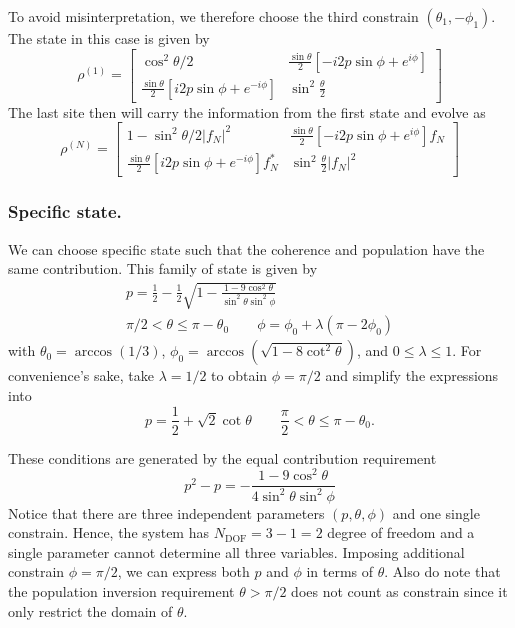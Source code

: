 \documentclass[../../../main.tex]{subfiles}
\begin{document}
To avoid misinterpretation, we therefore choose the third constrain \((\theta_1,-\phi_1)\).
The state in this case is given by
\begin{equation*}
  \rho ^{(1)} =
  \begin{bmatrix}
    \cos ^2 \theta/2                                                 & \frac{\sin \theta}{2} \left[-i2p \sin \phi + e^{i\phi}  \right] \\
    \frac{\sin \theta  }{2} \left[i2p \sin\phi + e^{-i\phi}  \right] & \sin ^2 \frac{\theta  }{2}
  \end{bmatrix}
\end{equation*}
The last site then will carry the information from the first state and evolve as
\begin{equation*}
  \rho ^{(N)}  =
  \begin{bmatrix}
    1- \sin^2 \theta/2 |f_N|^2                                             & \frac{\sin \theta}{2} \left[-i2p \sin \phi + e^{i\phi}  \right]f_N \\
    \frac{\sin \theta  }{2} \left[i2p \sin\phi + e^{-i\phi}  \right]f_N ^* & \sin ^2 \frac{\theta  }{2}|f_N|^2
  \end{bmatrix}
\end{equation*}

\subsubsection{Specific state.}
We can choose specific state such that the coherence and population have the same contribution.
This family of state is given by
\begin{gather*}
  p = \frac{1 }{2 }- \frac{1 }{2} \sqrt{1 - \frac{1-9\cos^2\theta}{\sin^2\theta\sin^2\phi}}\\
  \pi/2<\theta\le \pi - \theta_0 \qquad
  \phi = \phi_0 + \lambda( \pi - 2\phi_0)
\end{gather*}
with $\theta_0 = \arccos(1/3)$, $\phi_0 = \arccos(\sqrt{ 1-8 \cot ^2 \theta}) $, and $0 \le \lambda \le 1$.
For convenience’s sake, take $\lambda=1/2$ to obtain $\phi=\pi/2$ and simplify the expressions into
\begin{equation*}
  p=\frac12+\sqrt2\cot\theta\qquad
  \frac{\pi}{2}<\theta\le\pi-\theta_0.
\end{equation*}

These conditions are generated by the equal contribution requirement
\begin{equation*}
  p^2-p=- \frac{1-9\cos^2\theta}{4\sin^2\theta\sin^2\phi}
\end{equation*}
Notice that there are three independent parameters $(p,\theta,\phi)$ and one single constrain.
Hence, the system has $N_\text{DOF} = 3-1 =2$ degree of freedom and a single parameter cannot determine all three variables.
Imposing additional constrain $\phi = \pi/2$, we can express both $p$ and $\phi$ in terms of $\theta$.
Also do note that the population inversion requirement $\theta>\pi/2$ does not count as constrain since it only restrict the domain of $\theta$.
\end{document}
